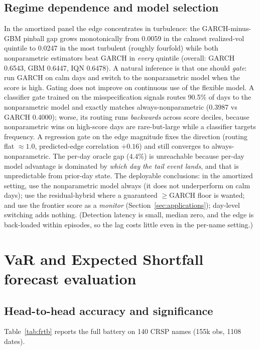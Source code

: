 \documentclass[11pt]{article}
\theoremstyle{remark}
\begin{document}
\subsection{Regime dependence and model selection}
\label{sec:gate}

In the amortized panel the edge concentrates in turbulence: the
GARCH-minus-GBM pinball gap grows monotonically from 0.0059 in the
calmest realized-vol quintile to 0.0247 in the most turbulent (roughly
fourfold) while both nonparametric estimators beat GARCH in
\emph{every} quintile (overall: GARCH 0.6543, GBM 0.6447, IQN 0.6478).
A natural inference is that one should \emph{gate}: run GARCH on calm
days and switch to the nonparametric model when the score is high. Gating
does not improve on continuous use of the flexible model. A classifier
gate trained on the misspecification
signals routes 90.5\% of days to the nonparametric model and exactly
matches always-nonparametric (0.3987 vs GARCH 0.4000); worse, its
routing runs \emph{backwards} across score deciles, because nonparametric
wins on high-score days are rare-but-large while a classifier targets
frequency. A regression gate on the edge magnitude fixes the direction
(routing flat $\approx 1.0$, predicted-edge correlation $+0.16$) and
still converges to always-nonparametric. The per-day oracle gap
($4.4\%$) is unreachable because per-day model advantage is dominated by
\emph{which day the tail event lands}, and that is unpredictable from
prior-day state. The deployable conclusions: in the amortized setting, use the
nonparametric model always (it does not underperform on calm days); use
the residual-hybrid where a guaranteed $\ge$GARCH floor is wanted; and
use the frontier score as a \emph{monitor} (Section~\ref{sec:applications});
day-level switching adds nothing. (Detection latency is small, median zero, and the edge is back-loaded
within episodes, so the lag costs little even in the per-name
setting.)

\section{VaR and Expected Shortfall forecast evaluation}\label{sec:frtb}

\subsection{Head-to-head accuracy and significance}

Table~\ref{tab:frtb} reports the full battery on 140 CRSP names
(155k obs, 1108 dates).
\end{document}
